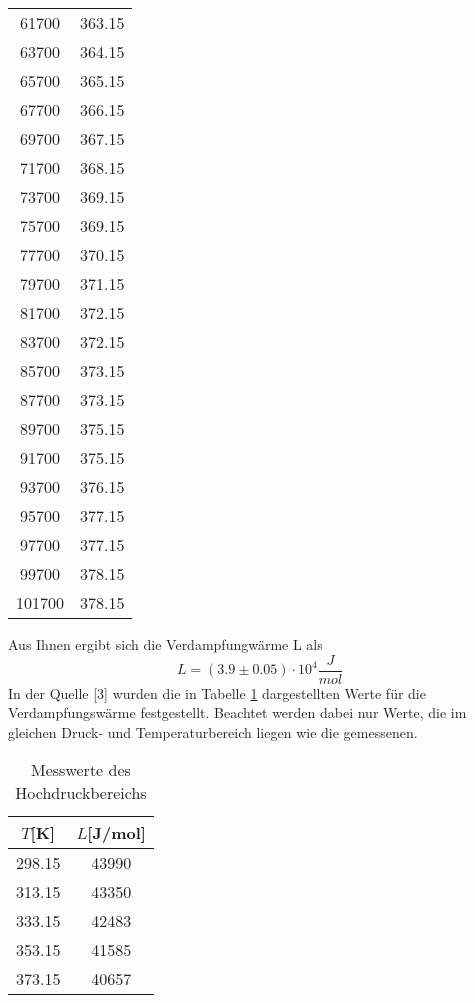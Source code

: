 \begin{table}[H]
\begin{tabular}{c c}
      61700 &   363.15 \\ 
      63700 &   364.15 \\ 
      65700 &   365.15 \\ 
      67700 &   366.15 \\ 
      69700 &   367.15 \\ 
      71700 &   368.15 \\ 
      73700 &   369.15 \\ 
      75700 &   369.15 \\ 
      77700 &   370.15 \\ 
      79700 &   371.15 \\ 
      81700 &   372.15 \\ 
      83700 &   372.15 \\ 
      85700 &   373.15 \\ 
      87700 &   373.15 \\
      89700 &   375.15 \\ 
      91700 &   375.15 \\ 
      93700 &   376.15 \\ 
      95700 &   377.15 \\ 
      97700 &   377.15 \\ 
      99700 &   378.15 \\ 
      101700 &   378.15 \\ 
    \bottomrule
    \end{tabular}
\end{table}
\noindent Aus Ihnen ergibt sich die Verdampfungwärme L als 
\begin{equation*}
    L= (3.9 \pm 0.05) \cdot 10^4 \dfrac{J}{mol}
\end{equation*}
\noindent In der Quelle [3] wurden die in Tabelle \ref{tab:ndrtheo} dargestellten Werte
für die Verdampfungswärme festgestellt. Beachtet werden dabei nur Werte, die im gleichen 
Druck- und Temperaturbereich liegen wie die gemessenen.
\begin{table}[H]
\centering
   \caption{Messwerte des Hochdruckbereichs}
   \label{tab:ndrtheo}
   \begin{tabular}{c c}
   \toprule
    $T$[K] & $L$[J/mol] \\
    \midrule
    298.15 &    43990 \\ 
    313.15 &    43350 \\   
    333.15 &    42483 \\   
    353.15 &    41585 \\   
    373.15 &    40657 \\   
    \bottomrule
    \end{tabular}
\end{table}
